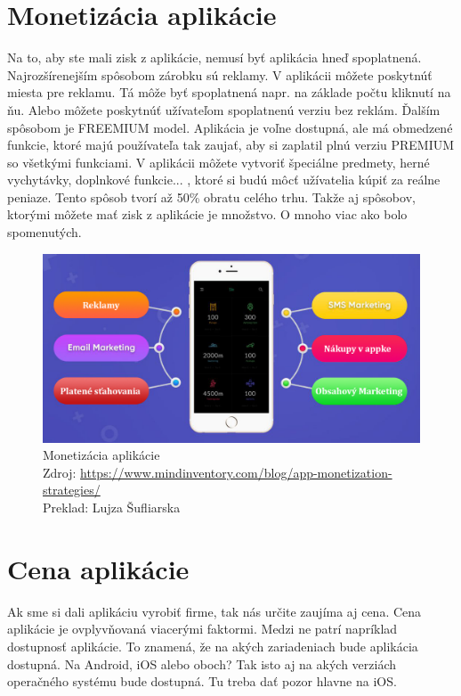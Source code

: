 \documentclass[10pt,twoside,slovak,a4paper]{article}
\begin{document}
\section{Monetizácia aplikácie}
\quad Na to, aby ste mali zisk z aplikácie, nemusí byť aplikácia hneď spoplatnená. Najrozšírenejším spôsobom zárobku sú reklamy. V aplikácii môžete poskytnúť miesta pre reklamu. Tá môže byť spoplatnená napr. na základe počtu kliknutí na ňu. Alebo môžete poskytnúť užívateľom spoplatnenú verziu bez reklám. Ďalším spôsobom je FREEMIUM model. Aplikácia je voľne dostupná, ale má obmedzené funkcie, ktoré majú používateľa tak zaujať, aby si zaplatil plnú verziu PREMIUM so všetkými funkciami. V aplikácii môžete vytvoriť špeciálne predmety, herné vychytávky, doplnkové funkcie... , ktoré si budú môcť užívatelia kúpiť za reálne peniaze. Tento spôsob tvorí až 50\% obratu celého trhu. Takže aj spôsobov, ktorými môžete mať zisk z aplikácie je množstvo. O mnoho viac ako bolo spomenutých.
\cite{pixelfield}

\begin{figure}[h!]
\includegraphics[scale=0.3]{monetizacia}
\centering
\caption{Monetizácia aplikácie
\\ Zdroj: \url{https://www.mindinventory.com/blog/app-monetization-strategies/}
\\ Preklad: Lujza Šufliarska}
\end{figure}



\section{Cena aplikácie}
\quad Ak sme si dali aplikáciu vyrobiť firme, tak nás určite zaujíma aj cena. Cena aplikácie je ovplyvňovaná viacerými faktormi. Medzi ne patrí napríklad dostupnosť aplikácie. To znamená, že na akých zariadeniach bude aplikácia dostupná. Na Android, iOS alebo oboch? Tak isto aj na akých verziách operačného systému bude dostupná. Tu treba dať pozor hlavne na iOS.
\end{document}
